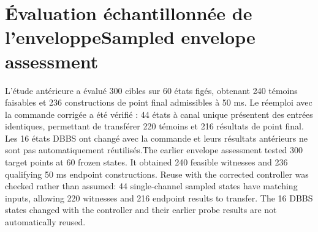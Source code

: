 \documentclass[11pt,a4paper,oneside]{report}
\newcommand{\bi}[2]{\iffrench #2\else #1\fi}
\renewcommand{\sec}[2]{\section{\bi{#1}{#2}}}
\begin{document}
\sec{Sampled envelope assessment}{Évaluation échantillonnée de l'enveloppe}
\bi{The earlier envelope assessment tested 300 target points at 60 frozen states. It obtained 240 feasible witnesses and 236 qualifying 50 ms endpoint constructions. Reuse with the corrected controller was checked rather than assumed: 44 single-channel sampled states have matching inputs, allowing 220 witnesses and 216 endpoint results to transfer. The 16 DBBS states changed with the controller and their earlier probe results are not automatically reused.}{L'étude antérieure a évalué 300 cibles sur 60 états figés, obtenant 240 témoins faisables et 236 constructions de point final admissibles à 50 ms. Le réemploi avec la commande corrigée a été vérifié : 44 états à canal unique présentent des entrées identiques, permettant de transférer 220 témoins et 216 résultats de point final. Les 16 états DBBS ont changé avec la commande et leurs résultats antérieurs ne sont pas automatiquement réutilisés.}
\end{document}
